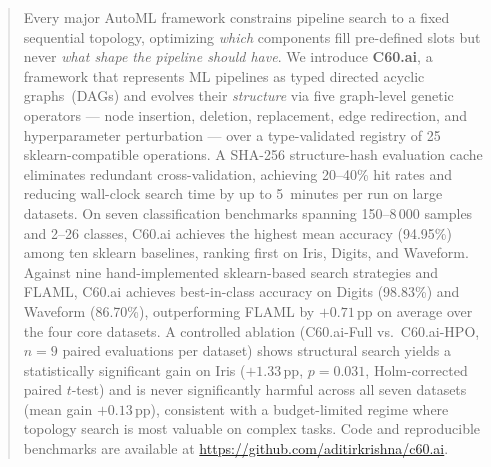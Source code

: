 \documentclass{article}
\theoremstyle{definition}
\theoremstyle{plain}
\theoremstyle{remark}
\begin{document}

\printAffiliationsAndNotice{}

\begin{abstract}
Every major AutoML framework constrains pipeline search to a fixed sequential
topology, optimizing \emph{which} components fill pre-defined slots but
never \emph{what shape the pipeline should have}.
We introduce \textbf{C60.ai}, a framework that represents ML pipelines as
typed directed acyclic graphs~(DAGs) and evolves their \emph{structure} via
five graph-level genetic operators — node insertion, deletion, replacement,
edge redirection, and hyperparameter perturbation — over a type-validated
registry of 25 sklearn-compatible operations.
A SHA-256 structure-hash evaluation cache eliminates redundant cross-validation,
achieving 20--40\% hit rates and reducing wall-clock search time by up to
5~minutes per run on large datasets.
On seven classification benchmarks spanning 150--8\,000 samples and 2--26
classes, C60.ai achieves the highest mean accuracy (94.95\%) among ten
sklearn baselines, ranking first on Iris, Digits, and Waveform.
Against nine hand-implemented sklearn-based search strategies and FLAML,
C60.ai achieves best-in-class accuracy on Digits (98.83\%) and
Waveform (86.70\%), outperforming FLAML by $+0.71$\,pp on average over the
four core datasets.
A controlled ablation (C60.ai-Full vs.\ C60.ai-HPO, $n{=}9$ paired
evaluations per dataset) shows structural search yields a statistically
significant gain on Iris ($+1.33$\,pp, $p{=}0.031$, Holm-corrected
paired $t$-test) and is never significantly harmful across all seven
datasets (mean gain $+0.13$\,pp), consistent with a budget-limited regime
where topology search is most valuable on complex tasks.
Code and reproducible benchmarks are available at
\url{https://github.com/aditirkrishna/c60.ai}.
\end{abstract}
\end{document}

